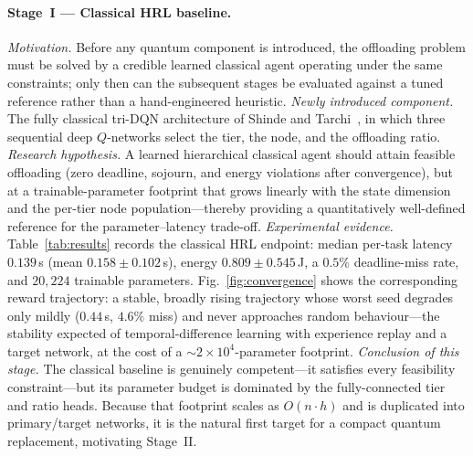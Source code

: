 \documentclass[11pt,a4paper]{article}
\theoremstyle{definition}
\begin{document}
\paragraph{Stage~I --- Classical HRL baseline.}
\emph{Motivation.} Before any quantum component is introduced, the offloading problem must be solved by a credible learned classical agent operating under the same constraints; only then can the subsequent stages be evaluated against a tuned reference rather than a hand-engineered heuristic.
\emph{Newly introduced component.} The fully classical tri-DQN architecture of Shinde and Tarchi~\cite{hrl_ntn}, in which three sequential deep $Q$-networks select the tier, the node, and the offloading ratio.
\emph{Research hypothesis.} A learned hierarchical classical agent should attain feasible offloading (zero deadline, sojourn, and energy violations after convergence), but at a trainable-parameter footprint that grows linearly with the state dimension and the per-tier node population---thereby providing a quantitatively well-defined reference for the parameter--latency trade-off.
\emph{Experimental evidence.} Table~\ref{tab:results} records the classical HRL endpoint: median per-task latency $0.139$\,s (mean $0.158\pm0.102$\,s), energy $0.809\pm0.545$\,J, a $0.5\%$ deadline-miss rate, and $20{,}224$ trainable parameters. Fig.~\ref{fig:convergence} shows the corresponding reward trajectory: a stable, broadly rising trajectory whose worst seed degrades only mildly ($0.44$\,s, $4.6\%$ miss) and never approaches random behaviour---the stability expected of temporal-difference learning with experience replay and a target network, at the cost of a $\sim$$2\!\times\!10^{4}$-parameter footprint.
\emph{Conclusion of this stage.} The classical baseline is genuinely competent---it satisfies every feasibility constraint---but its parameter budget is dominated by the fully-connected tier and ratio heads. Because that footprint scales as $O(n\cdot h)$ and is duplicated into primary/target networks, it is the natural first target for a compact quantum replacement, motivating Stage~II.
\end{document}
